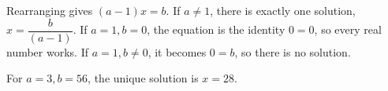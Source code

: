 Rearranging gives $(a-1)x=b$. If $a\ne1$, there is exactly one solution, $\boxed{x=\dfrac{b}{(a-1)}}$. If $a=1,b=0$, the equation is the identity $0=0$, so every real number works. If $a=1,b\ne0$, it becomes $0=b$, so there is no solution.

For $a=3,b=56$, the unique solution is $\boxed{x=28}$.
